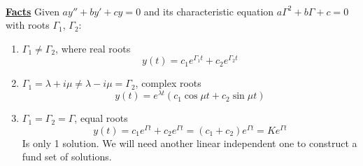 \redhline\\
\underline{\textbf{Facts}} Given $ay'' + by' + cy = 0$ and its characteristic equation $a\Gamma^2 + b\Gamma + c = 0$ with roots $\Gamma_1$, $\Gamma_2$:
\begin{enumerate}[label=\protect\circled{\Roman*}]
	\item $\Gamma_1 \neq \Gamma_2$, where real roots
	\begin{equation*}
		y(t) = c_1 e^{\Gamma_1 t} + c_2 e^{\Gamma_2 t} \tag{real roots}
	\end{equation*}
	\item $\Gamma_1 = \lambda + i\mu \neq \lambda - i\mu = \Gamma_2$, complex roots
	\begin{equation*}
		y(t) = e^{\lambda t} (c_1 \cos \mu t + c_2 \sin \mu t) \tag{complex roots}
	\end{equation*}
	\item $\Gamma_1 = \Gamma_2 = \Gamma$, equal roots
	\begin{equation*}
		y(t) = c_1 e^{\Gamma t} + c_2 e^{\Gamma t} = (c_1 + c_2)e^{\Gamma t} = K e^{\Gamma t} \tag{equal roots}
	\end{equation*}
	Is only 1 solution. We will need another linear independent one to construct a fund set of solutions.
\end{enumerate}